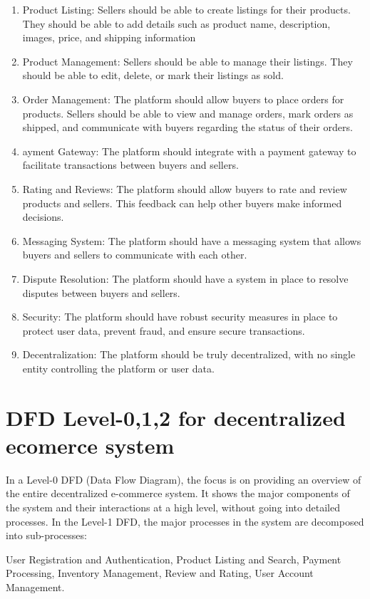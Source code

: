 \documentclass[a4paper,11pt]{article}
\begin{document}
\begin{center}
\begin{enumerate}
\item Product Listing: Sellers should be able to create listings for their products. They should be able to add details such as product name, description, images, price, and shipping information
\item Product Management: Sellers should be able to manage their listings. They should be able to edit, delete, or mark their listings as sold.
\item Order Management: The platform should allow buyers to place orders for products. Sellers should be able to view and manage orders, mark orders as shipped, and communicate with buyers regarding the status of their orders.
\item ayment Gateway: The platform should integrate with a payment gateway to facilitate transactions between buyers and sellers.
\item Rating and Reviews: The platform should allow buyers to rate and review products and sellers. This feedback can help other buyers make informed decisions.
\item Messaging System: The platform should have a messaging system that allows buyers and sellers to communicate with each other.
\item Dispute Resolution: The platform should have a system in place to resolve disputes between buyers and sellers.
\item Security: The platform should have robust security measures in place to protect user data, prevent fraud, and ensure secure transactions. 

\item Decentralization: The platform should be truly decentralized, with no single entity controlling the platform or user data.
\end{enumerate}


\section{DFD Level-0,1,2 for decentralized ecomerce system}
\vspace{1cm}

In a Level-0 DFD (Data Flow Diagram), the focus is on providing an overview of the entire decentralized e-commerce system. It shows the major components of the system and their interactions at a high level, without going into detailed processes.
In the Level-1 DFD, the major processes in the system are decomposed into sub-processes:

User Registration and Authentication, Product Listing and Search, Payment Processing, Inventory Management, Review and Rating, User Account Management.


\end{center}
\end{document}

